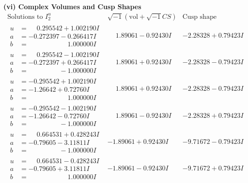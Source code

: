 \documentclass[1p]{elsarticle_modified}
\theoremstyle{definition}
\newcommand{\I}{\sqrt{-1}}
\begin{document}
\newpage\flushleft \textbf{(vi) Complex Volumes and Cusp Shapes}
$$\begin{array}{c|c|c}  
\text{Solutions to }I^u_{2}& \I (\text{vol} + \sqrt{-1}CS) & \text{Cusp shape}\\
 \hline 
\begin{aligned}
u &= \phantom{-}0.295542 + 1.002190 I \\
a &= -0.272397 - 0.266417 I \\
b &= \phantom{-0.000000 -}1.000000 I\end{aligned}
 & \phantom{-}1.89061 - 0.92430 I & -2.28328 + 0.79423 I \\ \hline\begin{aligned}
u &= \phantom{-}0.295542 - 1.002190 I \\
a &= -0.272397 + 0.266417 I \\
b &= \phantom{-0.000000 } -1.000000 I\end{aligned}
 & \phantom{-}1.89061 + 0.92430 I & -2.28328 - 0.79423 I \\ \hline\begin{aligned}
u &= -0.295542 + 1.002190 I \\
a &= -1.26642 + 0.72760 I \\
b &= \phantom{-0.000000 -}1.000000 I\end{aligned}
 & \phantom{-}1.89061 + 0.92430 I & -2.28328 - 0.79423 I \\ \hline\begin{aligned}
u &= -0.295542 - 1.002190 I \\
a &= -1.26642 - 0.72760 I \\
b &= \phantom{-0.000000 } -1.000000 I\end{aligned}
 & \phantom{-}1.89061 - 0.92430 I & -2.28328 + 0.79423 I \\ \hline\begin{aligned}
u &= \phantom{-}0.664531 + 0.428243 I \\
a &= -0.79605 - 3.11811 I \\
b &= \phantom{-0.000000 } -1.000000 I\end{aligned}
 & -1.89061 + 0.92430 I & -9.71672 - 0.79423 I \\ \hline\begin{aligned}
u &= \phantom{-}0.664531 - 0.428243 I \\
a &= -0.79605 + 3.11811 I \\
b &= \phantom{-0.000000 -}1.000000 I\end{aligned}
 & -1.89061 - 0.92430 I & -9.71672 + 0.79423 I \\ \hline\begin{aligned}

\end{aligned}
\end{array}$$
\end{document}
